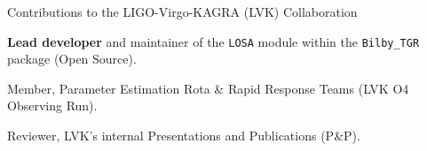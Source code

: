 \begin{rubric}{Contributions to the LIGO-Virgo-KAGRA (LVK) Collaboration}

\entry*[]
	\textbf{Lead developer} and maintainer of the \texttt{LOSA} module within the \texttt{Bilby\_TGR} package (Open Source).

\entry*[]
	Member, Parameter Estimation Rota \& Rapid Response Teams (LVK O4 Observing Run).
	
\entry*[]
	Reviewer, LVK's internal Presentations and Publications (P\&P).

\end{rubric}
